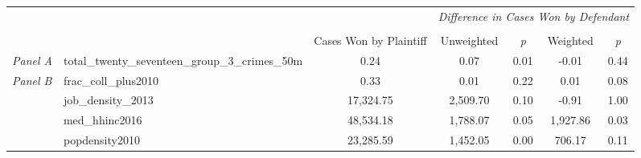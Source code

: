 \begin{tabular}{llccccc}
\toprule
 &  & \textit{} & \multicolumn{4}{c}{\textit{Difference in Cases Won by Defendant}} \\
\cline{4-7}
\\
 &  & Cases Won by Plaintiff & Unweighted & \emph{p} & Weighted & \emph{p} \\
\midrule
\textit{Panel A} & total_twenty_seventeen_group_3_crimes_50m & 0.24 & 0.07 & 0.01 & -0.01 & 0.44 \\
\cline{1-7}
\multirow[c]{4}{3cm}{\textit{Panel B}} & frac_coll_plus2010 & 0.33 & 0.01 & 0.22 & 0.01 & 0.08 \\
 & job_density_2013 & 17,324.75 & 2,509.70 & 0.10 & -0.91 & 1.00 \\
 & med_hhinc2016 & 48,534.18 & 1,788.07 & 0.05 & 1,927.86 & 0.03 \\
 & popdensity2010 & 23,285.59 & 1,452.05 & 0.00 & 706.17 & 0.11 \\
\cline{1-7}
\bottomrule
\end{tabular}
